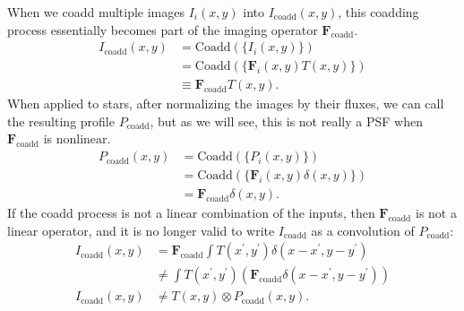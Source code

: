 \documentclass[modern]{style_and_logos/lsstdescnote}
\begin{document}
When we coadd multiple images $I_i(x,y)$ into $I_\mathrm{coadd}(x,y)$, this coadding process
essentially becomes part of the imaging operator $\mathbf{F}_\mathrm{coadd}$.
\begin{align}
    I_\mathrm{coadd}(x,y) &= \mathrm{Coadd} \left( \{ I_i(x,y) \} \right) \nonumber\\
    &= \mathrm{Coadd} \left( \{ \mathbf{F}_i(x,y) T(x,y) \} \right) \nonumber\\
    &\equiv \mathbf{F}_\mathrm{coadd} T(x,y).
\end{align}
When applied to stars, after normalizing the images by their fluxes,
we can call the resulting profile $P_\mathrm{coadd}$, but as we will see, this is
not really a PSF when $\mathbf{F}_\mathrm{coadd}$ is nonlinear.
\begin{align}
    P_\mathrm{coadd}(x,y) &= \mathrm{Coadd} \left( \{ P_i(x,y) \} \right) \nonumber\\
    &= \mathrm{Coadd} \left( \{ \mathbf{F}_i(x,y) \delta(x,y) \} \right) \nonumber\\
    &= \mathbf{F}_\mathrm{coadd} \delta(x,y).
\end{align}
If the coadd process is not a linear combination of the inputs, 
then $\mathbf{F}_\mathrm{coadd}$ is not a linear operator, and it is no longer valid to
write $I_\mathrm{coadd}$ as a convolution of $P_\mathrm{coadd}$:
\begin{align}
    I_\mathrm{coadd}(x,y) &= \mathbf{F}_\mathrm{coadd} \int T(x^\prime,y^\prime) \delta(x-x^\prime,y-y^\prime) \nonumber\\
    &\ne \int T(x^\prime,y^\prime) \left( \mathbf{F}_\mathrm{coadd} \delta(x-x^\prime,y-y^\prime) \right) \nonumber\\
    I_\mathrm{coadd}(x,y) &\ne T(x,y) \otimes P_\mathrm{coadd}(x,y).
\end{align}
\end{document}
